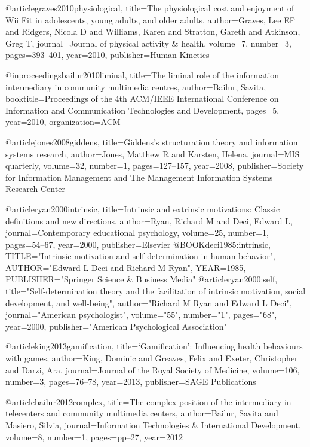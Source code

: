 @article{graves2010physiological,
  title={The physiological cost and enjoyment of Wii Fit in adolescents, young adults, and older adults},
  author={Graves, Lee EF and Ridgers, Nicola D and Williams, Karen and Stratton, Gareth and Atkinson, Greg T},
  journal={Journal of physical activity \& health},
  volume={7},
  number={3},
  pages={393--401},
  year={2010},
  publisher={Human Kinetics}
}



@inproceedings{bailur2010liminal,
  title={The liminal role of the information intermediary in community multimedia centres},
  author={Bailur, Savita},
  booktitle={Proceedings of the 4th ACM/IEEE International Conference on Information and Communication Technologies and Development},
  pages={5},
  year={2010},
  organization={ACM}
}

@article{jones2008giddens,
  title={Giddens's structuration theory and information systems research},
  author={Jones, Matthew R and Karsten, Helena},
  journal={MIS quarterly},
  volume={32},
  number={1},
  pages={127--157},
  year={2008},
  publisher={Society for Information Management and The Management Information Systems Research Center}
}

@article{ryan2000intrinsic,
  title={Intrinsic and extrinsic motivations: Classic definitions and new directions},
  author={Ryan, Richard M and Deci, Edward L},
  journal={Contemporary educational psychology},
  volume={25},
  number={1},
  pages={54--67},
  year={2000},
  publisher={Elsevier}
}
@BOOK{deci1985:intrinsic,
  TITLE="Intrinsic motivation and self-determination in human behavior",
  AUTHOR="Edward L Deci and Richard M Ryan",
  YEAR={1985},
  PUBLISHER="Springer Science \& Business Media"
}
@article{ryan2000:self,
  title="Self-determination theory and the facilitation of intrinsic motivation, social development, and well-being",
  author="Richard M Ryan and Edward L Deci",
  journal="American psychologist",
  volume="55",
  number="1",
  pages="68",
  year={2000},
  publisher="American Psychological Association"
}

@article{king2013gamification,
  title={‘Gamification’: Influencing health behaviours with games},
  author={King, Dominic and Greaves, Felix and Exeter, Christopher and Darzi, Ara},
  journal={Journal of the Royal Society of Medicine},
  volume={106},
  number={3},
  pages={76--78},
  year={2013},
  publisher={SAGE Publications}
}


@article{bailur2012complex,
  title={The complex position of the intermediary in telecenters and community multimedia centers},
  author={Bailur, Savita and Masiero, Silvia},
  journal={Information Technologies \& International Development},
  volume={8},
  number={1},
  pages={pp--27},
  year={2012}
}


